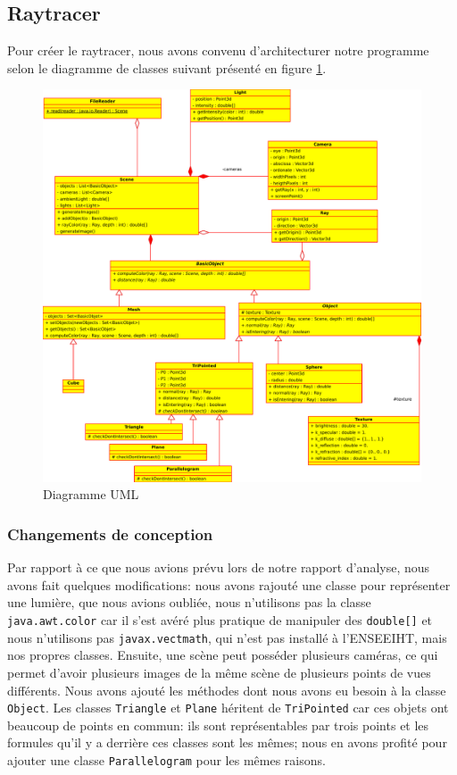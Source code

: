 \documentclass[a4paper]{article}
\begin{document}
  \subsection{Raytracer}
    Pour créer le raytracer, nous avons convenu d'architecturer notre programme
    selon le diagramme de classes suivant présenté en figure \ref{fig:uml}.
    \begin{figure}[p]
      \centerline{\includegraphics[width=1.2\textwidth]{uml.pdf}}
      \caption{Diagramme UML\label{fig:uml}}
    \end{figure}
    \subsubsection{Changements de conception}
      Par rapport à ce que nous avions prévu lors de notre rapport d'analyse,
      nous avons fait quelques modifications: nous avons rajouté une classe
      pour représenter une lumière, que nous avions oubliée, nous n'utilisons
      pas la classe \verb+java.awt.color+ car il s'est avéré plus pratique de
      manipuler des \verb+double[]+ et nous n'utilisons pas
      \verb+javax.vectmath+, qui n'est pas installé à l'ENSEEIHT, mais nos
      propres classes.
      Ensuite, une scène peut posséder plusieurs caméras, ce qui permet d'avoir
      plusieurs images de la même scène de plusieurs points de vues différents.
      Nous avons ajouté les méthodes dont nous avons eu besoin à la classe
      \verb+Object+. Les classes \verb+Triangle+ et \verb+Plane+ héritent de
      \verb+TriPointed+ car ces objets ont beaucoup de points en commun: ils
      sont représentables par trois points et les formules qu'il y a derrière
      ces classes sont les mêmes; nous en avons profité pour ajouter une classe
      \verb+Parallelogram+ pour les mêmes raisons.
      
\end{document}
